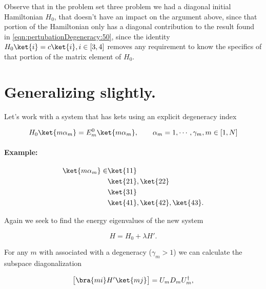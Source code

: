 Observe that in the problem set three problem we had a diagonal initial Hamiltonian $H_0$, that doesn't have an impact on the argument above, since that portion of the Hamiltonian only has a diagonal contribution to the result found in \ref{eqn:pertubationDegeneracy:50}, since the identity $H_0 \ket{i} = c \ket{i}, i \in [3,4]$ removes any requirement to know the specifics of that portion of the matrix element of $H_0$.

\section{Generalizing slightly.}

Let's work with a system that has kets using an explicit degeneracy index

\begin{equation}\label{eqn:pertubationDegeneracy:110}
H_0 \ket{m \alpha_m} = E_m^0 \ket{m \alpha_m}, \qquad \alpha_m = 1, \cdots, \gamma_m, m \in [1, N]
\end{equation}

\paragraph{Example:}

\begin{equation}\label{eqn:pertubationDegeneracy:130}
\begin{aligned}
\ket{m \alpha_m} \in 
&\ket{11} \\
&\ket{21}, \ket{22} \\
&\ket{31} \\
&\ket{41}, \ket{42}, \ket{43}.
\end{aligned}
\end{equation}

Again we seek to find the energy eigenvalues of the new system

\begin{equation}\label{eqn:pertubationDegeneracy:150}
H = H_0 + \lambda H'.
\end{equation}

For any $m$ with associated with a degeneracy ($\gamma_m > 1$) we can calculate the subspace diagonalization

\begin{equation}\label{eqn:pertubationDegeneracy:170}
\begin{bmatrix}
\bra{m i} H' \ket{m j}
\end{bmatrix}
= U_m D_m U_m^\dagger,
\end{equation}


